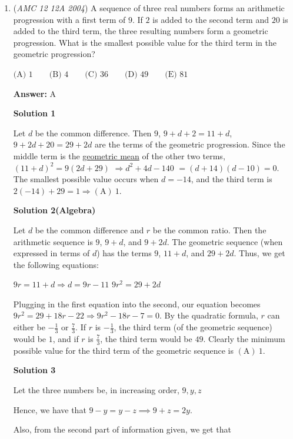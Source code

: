 \begin{enumerate}
	\item (\textit{AMC 12 12A 2004}) A sequence of three real numbers forms an arithmetic progression with a first term of $9$. If $2$ is added to the second term and $20$ is added to the third term, the three resulting numbers form a geometric progression. What is the smallest possible value for the third term in the geometric progression?


 $\text {(A) } 1 \qquad \text {(B) } 4 \qquad \text {(C) } 36 \qquad \text {(D) } 49 \qquad \text {(E) }81$

 \textbf{Answer: }A



\textbf{Solution 1}

Let $d$ be the common difference. Then $9$, $9+d+2=11+d$, $9+2d+20=29+2d$ are the terms of the geometric progression. Since the middle term is the \href{https://artofproblemsolving.com/wiki/index.php?title=Geometric\_mean}{geometric mean} of the other two terms, $(11+d)^2 = 9(2d+29)$ $\Longrightarrow d^2 + 4d - 140$ $= (d+14)(d-10) = 0$. The smallest possible value occurs when $d = -14$, and the third term is $2(-14) + 29 = 1\Rightarrow\boxed{\mathrm{(A)}\ 1}$.

 



\textbf{Solution 2(Algebra)}

Let $d$ be the common difference and $r$ be the common ratio. Then the arithmetic sequence is $9$, $9+d$, and $9+2d$. The geometric sequence (when expressed in terms of $d$) has the terms $9$, $11+d$, and $29+2d$.  Thus, we get the following equations:

 $9r=11+d\Rightarrow d=9r-11$
$9r^2=29+2d$

 Plugging in the first equation into the second, our equation becomes $9r^2=29+18r-22\Longrightarrow9r^2-18r-7=0$. By the quadratic formula, $r$ can either be $-\frac{1}{3}$ or $\frac{7}{3}$.  If $r$ is $-\frac{1}{3}$, the third term (of the geometric sequence) would be $1$, and if $r$ is $\frac{7}{3}$, the third term would be $49$.  Clearly the minimum possible value for the third term of the geometric sequence is $\boxed{\mathrm{(A)}\ 1}$.

 



\textbf{Solution 3}

Let the three numbers be, in increasing order, $9,y,z$

 Hence, we have that $9-y=y-z\implies 9+z=2y$.

 Also, from the second part of information given, we get that


\end{enumerate}
